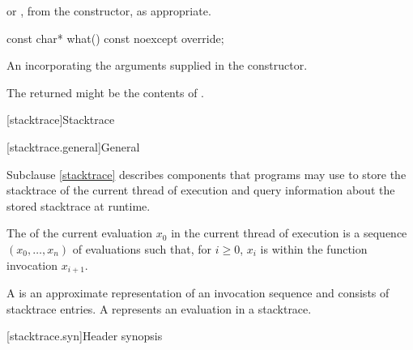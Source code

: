 \begin{itemdescr}
\pnum
\returns
{} or , from the constructor,
as appropriate.
\end{itemdescr}

%
\begin{itemdecl}
const char* what() const noexcept override;
\end{itemdecl}

\begin{itemdescr}
\pnum
\returns
An \ntbs{} incorporating the arguments supplied in the constructor.

\begin{note}
The returned \ntbs{} might be the contents of .
\end{note}
\end{itemdescr}

[stacktrace]{Stacktrace}

[stacktrace.general]{General}

\pnum
Subclause \ref{stacktrace} describes components
that \Cpp{} programs may use to store
the stacktrace of the current thread of execution and
query information about the stored stacktrace at runtime.

\pnum
The  of the current evaluation $x_0$
in the current thread of execution
is a sequence $(x_0, \ldots, x_n)$ of evaluations such that, for $i \geq 0$,
$x_i$ is within the function invocation $x_{i+1}$.

\pnum
A  is an approximate representation of
an invocation sequence and consists of stacktrace entries.
A  represents an evaluation in a stacktrace.

[stacktrace.syn]{Header  synopsis}

